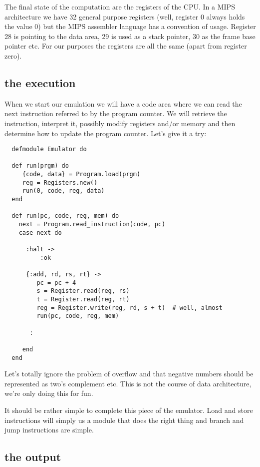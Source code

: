 \documentclass[a4paper,11pt]{article}
\begin{document}
The final state of the computation are the registers of the CPU. In a
MIPS architecture we have 32 general purpose registers (well, register
0 always holds the value 0) but the MIPS assembler language has a
convention of usage. Register 28 is pointing to the data area, 29 is
used as a stack pointer, 30 as the frame base pointer etc. For our
purposes the registers are all the same (apart from register zero).


\subsection{the execution}

When we start our emulation we will have a code area where we can read
the next instruction referred to by the program counter. We will
retrieve the instruction, interpret it, possibly modify registers
and/or memory and then determine how to update the program
counter. Let's give it a try:

\begin{verbatim}
  defmodule Emulator do

  def run(prgm) do
     {code, data} = Program.load(prgm)
     reg = Registers.new() 
     run(0, code, reg, data)
  end

  def run(pc, code, reg, mem) do
    next = Program.read_instruction(code, pc)
    case next do

      :halt ->  
          :ok

      {:add, rd, rs, rt} ->
         pc = pc + 4
         s = Register.read(reg, rs)
         t = Register.read(reg, rt)
         reg = Register.write(reg, rd, s + t)  # well, almost
         run(pc, code, reg, mem)
      
       :

     end
  end
\end{verbatim}
   
Let's totally ignore the problem of overflow and that negative numbers
should be represented as two's complement etc. This is not the course
of data architecture, we're only doing this for fun.

It should be rather simple to complete this piece of the
emulator. Load and store instructions will simply us a module
that does the right thing and branch and jump instructions are simple.

\subsection{the output}
\end{document}
